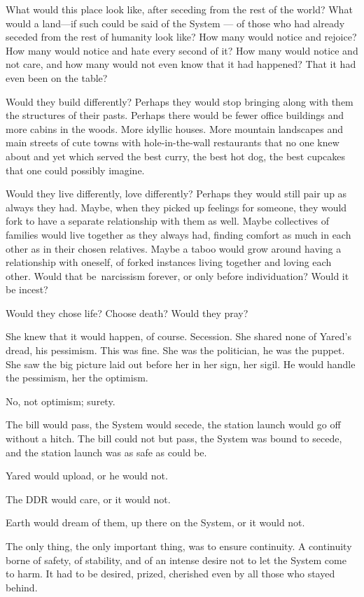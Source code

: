 What would this place look like, after seceding from the rest of the world? What would a land---if such could be said of the System — of those who had already seceded from the rest of humanity look like? How many would notice and rejoice? How many would notice and hate every second of it? How many would notice and not care, and how many would not even know that it had happened? That it had even been on the table?

Would they build differently? Perhaps they would stop bringing along with them the structures of their pasts. Perhaps there would be fewer office buildings and more cabins in the woods. More idyllic houses. More mountain landscapes and main streets of cute towns with hole-in-the-wall restaurants that no one knew about and yet which served the best curry, the best hot dog, the best cupcakes that one could possibly imagine.

Would they live differently, love differently? Perhaps they would still pair up as always they had. Maybe, when they picked up feelings for someone, they would fork to have a separate relationship with them as well. Maybe collectives of families would live together as they always had, finding comfort as much in each other as in their chosen relatives. Maybe a taboo would grow around having a relationship with oneself, of forked instances living together and loving each other. Would that be\pagebreak\ narcissism forever, or only before individuation? Would it be incest?

Would they chose life? Choose death? Would they pray?

She knew that it would happen, of course. Secession. She shared none of Yared's dread, his pessimism. This was fine. She was the politician, he was the puppet. She saw the big picture laid out before her in her sign, her sigil. He would handle the pessimism, her the optimism.

No, not optimism; surety.

The bill would pass, the System would secede, the station launch would go off without a hitch. The bill could not but pass, the System was bound to secede, and the station launch was as safe as could be.

Yared would upload, or he would not.

The DDR would care, or it would not.

Earth would dream of them, up there on the System, or it would not.

The only thing, the only important thing, was to ensure continuity. A continuity borne of safety, of stability, and of an intense desire not to let the System come to harm. It had to be desired, prized, cherished even by all those who stayed behind.

